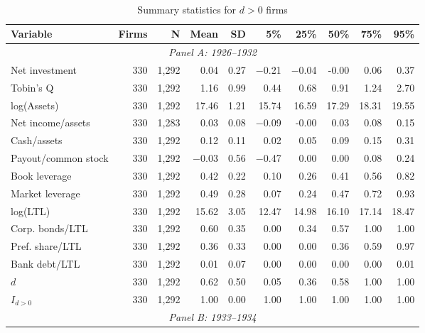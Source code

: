 \begin{table}[p]\centering
    \caption{\\ Summary statistics for $d > 0$ firms}\scriptsize
    \label{tabapp:summary_d_1}
    \begin{threeparttable}
        \begin{tabular}{lrrrrrrrrr}
            \toprule
            Variable & Firms & N & Mean & SD & 5\% & 25\% & 50\% & 75\% & 95\% \\
            \midrule
            \multicolumn{10}{c}{\textit{Panel A: 1926--1932}} \\
            \midrule
            Net investment & 330 & 1,292 & 0.04 & 0.27 & $-$0.21 & $-$0.04 & -0.00 & 0.06 & 0.37 \\
            Tobin's Q & 330 & 1,292 & 1.16 & 0.99 & 0.44 & 0.68 & 0.91 & 1.24 & 2.70 \\
            log(Assets) & 330 & 1,292 & 17.46 & 1.21 & 15.74 & 16.59 & 17.29 & 18.31 & 19.55 \\
            Net income/assets & 330 & 1,283 & 0.03 & 0.08 & $-$0.09 & -0.00 & 0.03 & 0.08 & 0.15 \\
            Cash/assets & 330 & 1,292 & 0.12 & 0.11 & 0.02 & 0.05 & 0.09 & 0.15 & 0.31 \\
            Payout/common stock & 330 & 1,292 & $-$0.03 & 0.56 & $-$0.47 & 0.00 & 0.00 & 0.08 & 0.24 \\
            Book leverage & 330 & 1,292 & 0.42 & 0.22 & 0.10 & 0.26 & 0.41 & 0.56 & 0.82 \\
            Market leverage & 330 & 1,292 & 0.49 & 0.28 & 0.07 & 0.24 & 0.47 & 0.72 & 0.93 \\
            log(LTL) & 330 & 1,292 & 15.62 & 3.05 & 12.47 & 14.98 & 16.10 & 17.14 & 18.47 \\
            Corp. bonds/LTL & 330 & 1,292 & 0.60 & 0.35 & 0.00 & 0.34 & 0.57 & 1.00 & 1.00 \\
            Pref. share/LTL & 330 & 1,292 & 0.36 & 0.33 & 0.00 & 0.00 & 0.36 & 0.59 & 0.97 \\
            Bank debt/LTL & 330 & 1,292 & 0.01 & 0.07 & 0.00 & 0.00 & 0.00 & 0.00 & 0.01 \\
            \ensuremath{d} & 330 & 1,292 & 0.62 & 0.50 & 0.05 & 0.36 & 0.58 & 1.00 & 1.00 \\
            \ensuremath{I_{d>0}} & 330 & 1,292 & 1.00 & 0.00 & 1.00 & 1.00 & 1.00 & 1.00 & 1.00 \\
            \midrule
            \multicolumn{10}{c}{\textit{Panel B: 1933--1934}} \\

\end{tabular}
\end{threeparttable}
\end{table}
